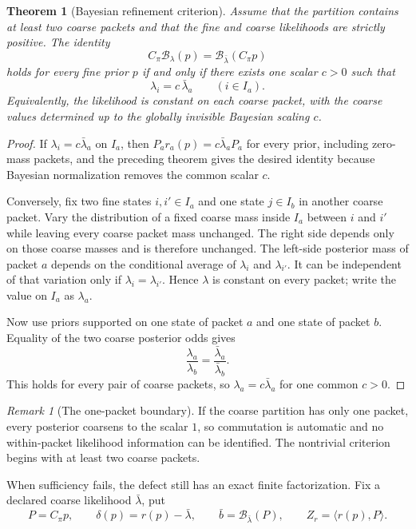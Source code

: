 \documentclass[11pt,letterpaper]{article}
\newtheorem{theorem}{Theorem}[section]
\theoremstyle{plain}
\theoremstyle{plain}
\theoremstyle{plain}
\theoremstyle{definition}
\theoremstyle{definition}
\theoremstyle{definition}
\theoremstyle{definition}
\theoremstyle{definition}
\theoremstyle{remark}
\theoremstyle{remark}
\newtheorem{remark}[remark]{Remark}
\theoremstyle{remark}
\theoremstyle{remark}
\theoremstyle{remark}
\newcommand{\cB}{\mathcal B}
\theoremstyle{remark}
\let\KomorebiPrimitiveMathcal\mathcal
\renewcommand{\mathcal}[1]{{\KomorebiPrimitiveMathcal{#1}}}
\begin{document}
\begin{theorem}[Bayesian refinement criterion]\label{core:record:021}
Assume that the partition contains at least two coarse packets and that the fine and coarse likelihoods are strictly positive.  The identity
\[
\boxed{
C_\pi\cB_\lambda(p)
=
\cB_{\bar\lambda}(C_\pi p)}
\]
holds for every fine prior $p$ if and only if there exists one scalar $c>0$ such that
\[
\boxed{
\lambda_i=c\,\bar\lambda_a
\qquad(i\in I_a).}
\]
Equivalently, the likelihood is constant on each coarse packet, with the coarse values determined up to the globally invisible Bayesian scaling $c$.
\end{theorem}

\begin{proof}
If $\lambda_i=c\bar\lambda_a$ on $I_a$, then $P_a r_a(p)=c\bar\lambda_aP_a$ for every prior, including zero-mass packets, and the preceding theorem gives the desired identity because Bayesian normalization removes the common scalar $c$.

Conversely, fix two fine states $i,i'\in I_a$ and one state $j\in I_b$ in another coarse packet.  Vary the distribution of a fixed coarse mass inside $I_a$ between $i$ and $i'$ while leaving every coarse packet mass unchanged.  The right side depends only on those coarse masses and is therefore unchanged.  The left-side posterior mass of packet $a$ depends on the conditional average of $\lambda_i$ and $\lambda_{i'}$.  It can be independent of that variation only if $\lambda_i=\lambda_{i'}$.  Hence $\lambda$ is constant on every packet; write the value on $I_a$ as $\lambda_a$.

Now use priors supported on one state of packet $a$ and one state of packet $b$.  Equality of the two coarse posterior odds gives
\[
\frac{\lambda_a}{\lambda_b}
=
\frac{\bar\lambda_a}{\bar\lambda_b}.
\]
This holds for every pair of coarse packets, so $\lambda_a=c\bar\lambda_a$ for one common $c>0$.
\end{proof}

\begin{remark}[The one-packet boundary]\label{core:record:022}
If the coarse partition has only one packet, every posterior coarsens to the scalar $1$, so commutation is automatic and no within-packet likelihood information can be identified.  The nontrivial criterion begins with at least two coarse packets.
\end{remark}

When sufficiency fails, the defect still has an exact finite factorization.  Fix a declared coarse likelihood $\bar\lambda$, put
\[
P=C_\pi p,
\qquad
\delta(p)=r(p)-\bar\lambda,
\qquad
\bar b=\cB_{\bar\lambda}(P),
\qquad
Z_r=\langle r(p),P\rangle.
\]
\end{document}
